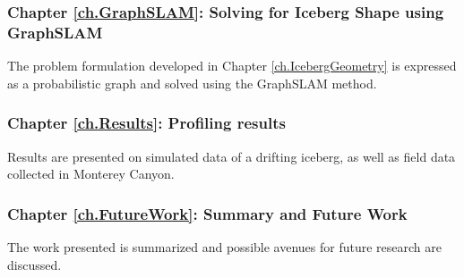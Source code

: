 \subsubsection*{Chapter \ref{ch.GraphSLAM}: Solving for Iceberg Shape using GraphSLAM} The problem formulation developed in Chapter \ref{ch.IcebergGeometry} is expressed as a probabilistic graph and solved using the GraphSLAM method.

\subsubsection*{Chapter \ref{ch.Results}: Profiling results} Results are presented on simulated data of a drifting iceberg, as well as field data collected in Monterey Canyon. 

\subsubsection*{Chapter \ref{ch.FutureWork}: Summary and Future Work}
The work presented is summarized and possible avenues for future research are discussed.